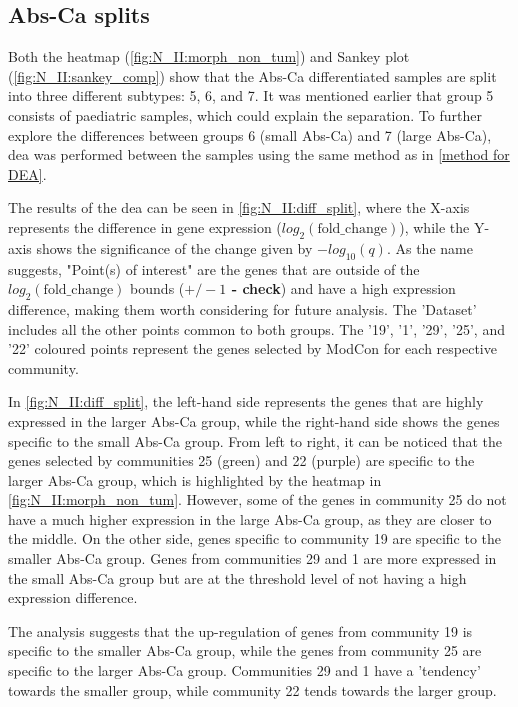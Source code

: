 \subsection{Abs-Ca splits} \label{s:N_II:diff_split}

Both the heatmap (\cref{fig:N_II:morph_non_tum}) and Sankey plot (\cref{fig:N_II:sankey_comp}) show that the Abs-Ca differentiated samples are split into three different subtypes: 5, 6, and 7. It was mentioned earlier that group 5 consists of paediatric samples, which could explain the separation. To further explore the differences between groups 6 (small Abs-Ca) and 7 (large Abs-Ca), \acrfull{dea} was performed between the samples using the same method as in \cref{method for DEA}.


The results of the \acrshort{dea} can be seen in \cref{fig:N_II:diff_split}, where the X-axis represents the difference in gene expression ($log_2(\text{fold\_change})$), while the Y-axis shows the significance of the change given by $-log_{10}(q)$. As the name suggests, "Point(s) of interest" are the genes that are outside of the $log_2(\text{fold\_change})$ bounds (\textbf{$+/-1$ - check}) and have a high expression difference, making them worth considering for future analysis. The 'Dataset' includes all the other points common to both groups. The '19', '1', '29', '25', and '22' coloured points represent the genes selected by ModCon for each respective community.

In \cref{fig:N_II:diff_split}, the left-hand side represents the genes that are highly expressed in the larger Abs-Ca group, while the right-hand side shows the genes specific to the small Abs-Ca group. From left to right, it can be noticed that the genes selected by communities 25 (green) and 22 (purple) are specific to the larger Abs-Ca group, which is highlighted by the heatmap in \cref{fig:N_II:morph_non_tum}. However, some of the genes in community 25 do not have a much higher expression in the large Abs-Ca group, as they are closer to the middle. On the other side, genes specific to community 19 are specific to the smaller Abs-Ca group. Genes from communities 29 and 1 are more expressed in the small Abs-Ca group but are at the threshold level of not having a high expression difference.


The analysis suggests that the up-regulation of genes from community 19 is specific to the smaller Abs-Ca group, while the genes from community 25 are specific to the larger Abs-Ca group. Communities 29 and 1 have a 'tendency' towards the smaller group, while community 22 tends towards the larger group.

